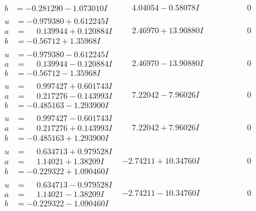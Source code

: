 \documentclass[1p]{elsarticle_modified}
\theoremstyle{definition}
\begin{document}
$$\begin{array}{c|c|c}
\begin{aligned}
b &= -0.281290 - 1.073010 I\end{aligned}
 & \phantom{-}4.04054 - 0.58078 I & \phantom{-0.000000 } 0 \\ \hline\begin{aligned}
u &= -0.979380 + 0.612245 I \\
a &= \phantom{-}0.139944 + 0.120884 I \\
b &= -0.56712 + 1.35968 I\end{aligned}
 & \phantom{-}2.46970 + 13.90880 I & \phantom{-0.000000 } 0 \\ \hline\begin{aligned}
u &= -0.979380 - 0.612245 I \\
a &= \phantom{-}0.139944 - 0.120884 I \\
b &= -0.56712 - 1.35968 I\end{aligned}
 & \phantom{-}2.46970 - 13.90880 I & \phantom{-0.000000 } 0 \\ \hline\begin{aligned}
u &= \phantom{-}0.997427 + 0.601743 I \\
a &= \phantom{-}0.217276 - 0.143993 I \\
b &= -0.485163 - 1.293900 I\end{aligned}
 & \phantom{-}7.22042 - 7.96026 I & \phantom{-0.000000 } 0 \\ \hline\begin{aligned}
u &= \phantom{-}0.997427 - 0.601743 I \\
a &= \phantom{-}0.217276 + 0.143993 I \\
b &= -0.485163 + 1.293900 I\end{aligned}
 & \phantom{-}7.22042 + 7.96026 I & \phantom{-0.000000 } 0 \\ \hline\begin{aligned}
u &= \phantom{-}0.634713 + 0.979528 I \\
a &= \phantom{-}1.14021 + 1.38209 I \\
b &= -0.229322 + 1.090460 I\end{aligned}
 & -2.74211 + 10.34760 I & \phantom{-0.000000 } 0 \\ \hline\begin{aligned}
u &= \phantom{-}0.634713 - 0.979528 I \\
a &= \phantom{-}1.14021 - 1.38209 I \\
b &= -0.229322 - 1.090460 I\end{aligned}
 & -2.74211 - 10.34760 I & \phantom{-0.000000 } 0 \\ \hline\begin{aligned}

\end{aligned}
\end{array}$$
\end{document}
